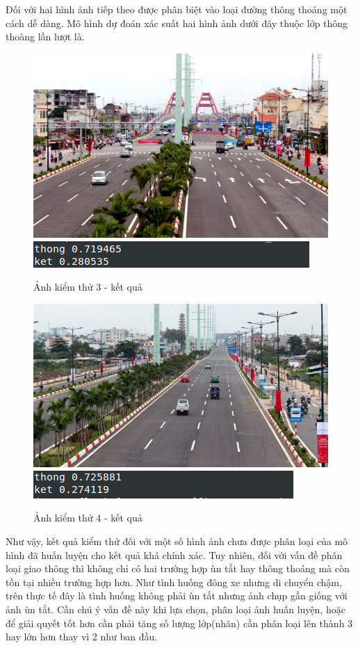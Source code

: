 	Đối với hai hình ảnh tiếp theo được phân biệt vào loại đường thông thoáng một cách dễ dàng. Mô hình dự đoán xác suất hai hình ảnh dưới đây thuộc lớp thông thoàng lần lượt là.
	
	\begin{figure}[h!]
		\centering
		\includegraphics[scale=0.7]{charts/test1.jpg}
		\includegraphics[scale=0.5]{charts/res_test1.png}
		\caption{Ảnh kiểm thử 3 - kết quả}
		\label{fig:test3}
	\end{figure}
	
	\begin{figure}[h!]
		\centering
		\includegraphics[scale=0.5]{charts/test3.jpg}
		\includegraphics[scale=0.5]{charts/res_test3.png}
		\caption{Ảnh kiểm thử 4 - kết quả}
		\label{fig:test4}
	\end{figure}
	\pagebreak
	Như vậy, kết quả kiểm thử đối với một số hình ảnh chưa được phân loại của mô hình đã huấn luyện cho kết quả khá chính xác. Tuy nhiên, đối với vấn đề  phân loại giao thông thì không chỉ có hai trường hợp ùn tắt hay thông thoáng mà còn tồn tại nhiều trường hợp hơn. Như tình huống đông xe nhưng di chuyển chậm, trên thực tế đây là tình huống không phải ùn tắt nhưng ảnh chụp gần giống với ảnh ùn tắt. Cần chú ý vấn đề này khi lựa chọn, phân loại ảnh huấn luyện, hoặc để giải quyết tốt hơn cần phải tăng số lượng lớp(nhãn) cần phân loại lên thành 3 hay lớn hơn thay vì 2 như ban đầu.
	
	
	